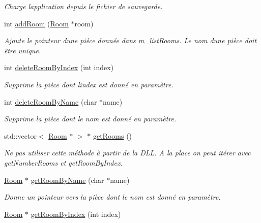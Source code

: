 \begin{DoxyCompactItemize}
\begin{DoxyCompactList}\small\item\em Charge l\textquotesingle{}application depuis le fichier de sauvegarde. \end{DoxyCompactList}\item 
int \hyperlink{class_e_p_1_1_core_a881e587636b0333397101372d7c3f6d9}{add\+Room} (\hyperlink{class_e_p_1_1_room}{Room} $\ast$room)
\begin{DoxyCompactList}\small\item\em Ajoute le pointeur d\textquotesingle{}une pièce donnée dans m\+\_\+list\+Rooms. Le nom d\textquotesingle{}une pièce doit être unique. \end{DoxyCompactList}\item 
int \hyperlink{class_e_p_1_1_core_a64f97c800663db86fc7b3626b4ce7d0f}{delete\+Room\+By\+Index} (int index)
\begin{DoxyCompactList}\small\item\em Supprime la pièce dont l\textquotesingle{}index est donné en paramètre. \end{DoxyCompactList}\item 
int \hyperlink{class_e_p_1_1_core_a2cacc28f799c8bfbb5d9c50202346c55}{delete\+Room\+By\+Name} (char $\ast$name)
\begin{DoxyCompactList}\small\item\em Supprime la pièce dont le nom est donné en paramètre. \end{DoxyCompactList}\item 
std\+::vector$<$ \hyperlink{class_e_p_1_1_room}{Room} $\ast$ $>$ $\ast$ \hyperlink{class_e_p_1_1_core_abbb72fd01eaa6e77f3fff6a4fe9f21c7}{get\+Rooms} ()
\begin{DoxyCompactList}\small\item\em Ne pas utiliser cette méthode à partir de la D\+LL. A la place on peut itérer avec get\+Number\+Rooms et get\+Room\+By\+Index. \end{DoxyCompactList}\item 
\hyperlink{class_e_p_1_1_room}{Room} $\ast$ \hyperlink{class_e_p_1_1_core_a4b4c84d507fe183c130faf32f345b0e1}{get\+Room\+By\+Name} (char $\ast$name)
\begin{DoxyCompactList}\small\item\em Donne un pointeur vers la pièce dont le nom est donné en paramètre. \end{DoxyCompactList}\item 
\hyperlink{class_e_p_1_1_room}{Room} $\ast$ \hyperlink{class_e_p_1_1_core_a0914409b3e2d84fd68a6898cca18ffc6}{get\+Room\+By\+Index} (int index)

\end{DoxyCompactItemize}
